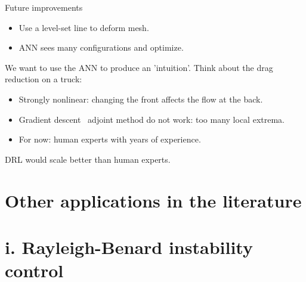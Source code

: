 \documentclass{beamer}
\begin{document}
\begin{frame}{Future improvements}
    \begin{itemize}
        \item Use a level-set line to deform mesh.
        \item ANN sees many configurations and optimize.
    \end{itemize}

    We want to use the ANN to produce an 'intuition'. Think about the drag reduction on a truck:

    \begin{itemize}
        \item Strongly nonlinear: changing the front affects the flow at the back.
        \item Gradient descent \ adjoint method do not work: too many local extrema.
        \item For now: human experts with years of experience.
    \end{itemize}

    DRL would scale better than human experts.
\end{frame}

\section{Other applications in the literature}

\section{i. Rayleigh-Benard instability control}
\end{document}
